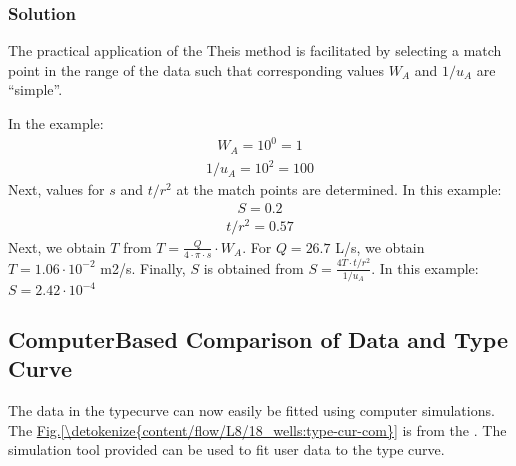\documentclass[letterpaper,10pt,english]{jupyterBook}
\let\sphinxpxdimen\pdfpxdimen\else\newdimen\sphinxpxdimen
\begin{document}
\subsubsection{Solution}
\label{\detokenize{content/flow/L8/18_wells:id6}}
\sphinxAtStartPar
The practical application of the Theis method is facilitated by selecting a match point in the range of the data such that corresponding values \(W_A\)
and \(1/u_A\) are “simple”.

\noindent{\hspace*{\fill}\sphinxincludegraphics[width=600\sphinxpxdimen]{{L08_f14}.png}\hspace*{\fill}}

\sphinxAtStartPar
In the example:
\begin{equation*}
\begin{split}
W_A = 10^0 = 1
\end{split}
\end{equation*}\begin{equation*}
\begin{split}
1/u_A = 10^2 = 100
\end{split}
\end{equation*}
\sphinxAtStartPar
Next, values for \(s\) and \(t/r^2\) at the match points are determined. In this example:
\begin{equation*}
\begin{split}
S = 0.2
\end{split}
\end{equation*}\begin{equation*}
\begin{split}
t/r^2 = 0.57
\end{split}
\end{equation*}
\sphinxAtStartPar
Next, we obtain \(T\) from \(T = \frac{Q}{4\cdot\pi\cdot s }\cdot W_A\). For \(Q = 26.7\) L/s, we obtain \(T = 1.06 \cdot 10^{-2} \) m2/s. Finally, \(S\) is obtained from \(S = \frac{4 T\cdot t/r^2}{1/u_A}\). In this example:
\(S = 2.42 \cdot 10^{-4}\)


\subsection{Computer\sphinxhyphen{}Based Comparison of Data and Type Curve}
\label{\detokenize{content/flow/L8/18_wells:computer-based-comparison-of-data-and-type-curve}}
\sphinxAtStartPar
The data in the type\sphinxhyphen{}curve can now easily be fitted using computer simulations. The \hyperref[\detokenize{content/flow/L8/18_wells:type-cur-com}]{Fig.\@ \ref{\detokenize{content/flow/L8/18_wells:type-cur-com}}} is from the {\hyperref[\detokenize{content/tutorials/T7/tutorial_07::doc}]{}}. The simulation tool {\hyperref[\detokenize{content/tools/type_curve_fit::doc}]{}} provided can be used to fit user data to the type curve.
\end{document}
